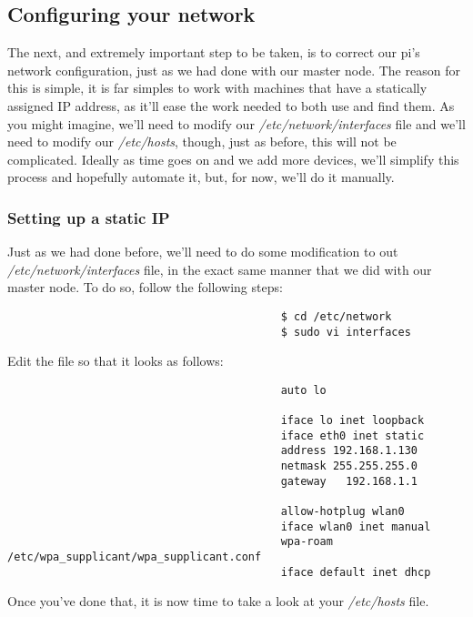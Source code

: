 \documentclass[]{article}
\begin{document}
                                          \subsection{Configuring your network}
                                          The next, and extremely important step to be taken, is to correct our pi's network configuration, just as we had done with our master 
                                          node. The reason for this is simple, it is far simples to work with machines that have a statically assigned IP address, as it'll ease
                                          the work needed to both use and find them. As you might imagine, we'll need to modify our \textit{/etc/network/interfaces} file and 
                                          we'll need to modify our \textit{/etc/hosts}, though, just as before, this will not be complicated. Ideally as time goes on and we add 
                                          more devices, we'll simplify this process and hopefully automate it, but, for now, we'll do it manually.

                                          \subsubsection{Setting up a static IP}
                                          Just as we had done before, we'll need to do some modification to out \textit{/etc/network/interfaces} file, in the exact same manner 
                                          that we did with our master node. To do so, follow the following steps:
                                          \begin{lstlisting}
                                          $ cd /etc/network
                                          $ sudo vi interfaces
                                          \end{lstlisting}
                                          Edit the file so that it looks as follows:
                                          \begin{lstlisting}
                                          auto lo

                                          iface lo inet loopback
                                          iface eth0 inet static
                                          address 192.168.1.130
                                          netmask 255.255.255.0
                                          gateway   192.168.1.1

                                          allow-hotplug wlan0
                                          iface wlan0 inet manual
                                          wpa-roam /etc/wpa_supplicant/wpa_supplicant.conf
                                          iface default inet dhcp
                                          \end{lstlisting}
                                          Once you've done that, it is now time to take a look at your \textit{/etc/hosts} file.
\end{document}
